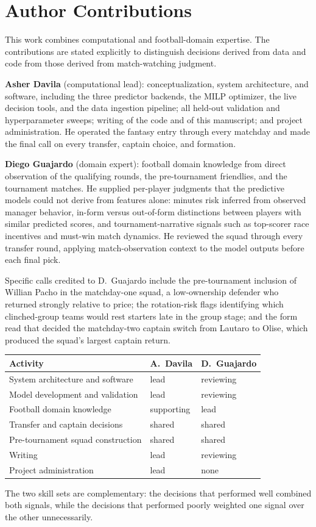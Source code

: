 \section*{Author Contributions}

This work combines computational and football-domain expertise. The
contributions are stated explicitly to distinguish decisions derived
from data and code from those derived from match-watching judgment.

\textbf{Asher Davila} (computational lead): conceptualization, system
architecture, and software, including the three predictor backends,
the MILP optimizer, the live decision tools, and the data ingestion
pipeline; all held-out validation and hyperparameter sweeps; writing
of the code and of this manuscript; and project administration. He
operated the fantasy entry through every matchday and made the final
call on every transfer, captain choice, and formation.

\textbf{Diego Guajardo} (domain expert): football domain knowledge
from direct observation of the qualifying rounds, the pre-tournament
friendlies, and the tournament matches. He supplied per-player
judgments that the predictive models could not derive from features
alone: minutes risk inferred from observed manager behavior, in-form
versus out-of-form distinctions between players with similar predicted
scores, and tournament-narrative signals such as top-scorer race
incentives and must-win match dynamics. He reviewed the squad through
every transfer round, applying match-observation context to the model
outputs before each final pick.

Specific calls credited to D.~Guajardo include the pre-tournament
inclusion of Willian Pacho in the matchday-one squad, a low-ownership
defender who returned strongly relative to price; the rotation-risk
flags identifying which clinched-group teams would rest starters late
in the group stage; and the form read that decided the matchday-two
captain switch from Lautaro to Olise, which produced the squad's
largest captain return.

\begin{center}
\begin{tabular}{lll}
\toprule
Activity & A.~Davila & D.~Guajardo \\
\midrule
System architecture and software & lead & reviewing \\
Model development and validation & lead & reviewing \\
Football domain knowledge & supporting & lead \\
Transfer and captain decisions & shared & shared \\
Pre-tournament squad construction & shared & shared \\
Writing & lead & reviewing \\
Project administration & lead & none \\
\bottomrule
\end{tabular}
\end{center}

The two skill sets are complementary: the decisions that performed
well combined both signals, while the decisions that performed poorly
weighted one signal over the other unnecessarily.
